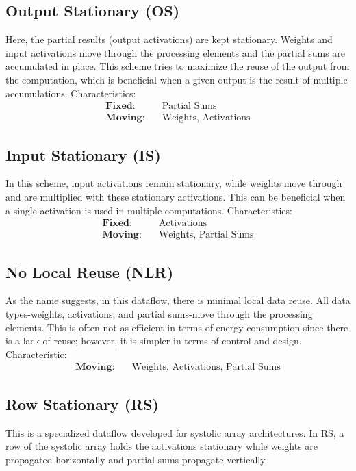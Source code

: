 \subsection*{Output Stationary (OS)}
Here, the partial results (output activations) are kept stationary. Weights and input activations move through the processing elements and the partial sums are accumulated in place. This scheme tries to maximize the reuse of the output from the computation, which is beneficial when a given output is the result of multiple accumulations. Characteristics:
\begin{align*}
\textbf{Fixed:} & \quad \text{Partial Sums} \\
\textbf{Moving:} & \quad \text{Weights, Activations}
\end{align*}

\subsection*{Input Stationary (IS)}
In this scheme, input activations remain stationary, while weights move through and are multiplied with these stationary activations. This can be beneficial when a single activation is used in multiple computations. Characteristics:
\begin{align*}
\textbf{Fixed:} & \quad \text{Activations} \\
\textbf{Moving:} & \quad \text{Weights, Partial Sums}
\end{align*}

\subsection*{No Local Reuse (NLR)}
As the name suggests, in this dataflow, there is minimal local data reuse. All data types-weights, activations, and partial sums-move through the processing elements. This is often not as efficient in terms of energy consumption since there is a lack of reuse; however, it is simpler in terms of control and design. Characteristic:
\begin{align*}
\textbf{Moving:} & \quad \text{Weights, Activations, Partial Sums}
\end{align*}

\subsection*{Row Stationary (RS)}
This is a specialized dataflow developed for systolic array architectures. In RS, a row of the systolic array holds the activations stationary while weights are propagated horizontally and partial sums propagate vertically.


